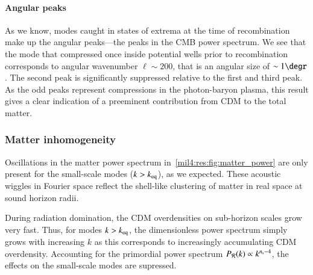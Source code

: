 





\paragraph{Angular peaks}
As we know, modes caught in states of extrema at the time of recombination make up the angular peaks---the peaks in the CMB power spectrum. We see that the mode that compressed once inside potential wells prior to recombination corresponds to angular wavenumber $\ell\sim 200$, that is an angular size of $\sim 1\degr$. The second peak is significantly suppressed relative to the first and third peak. As the odd peaks represent compressions in the photon-baryon plasma, this result gives a clear indication of a preeminent contribution from CDM to the total matter.  




\subsubsection{Matter inhomogeneity}
Oscillations in the matter power spectrum in~\cref{mil4:res:fig:matter_power} are only present for the small-scale modes ($k>k_\mathrm{eq}$), as we expected. These acoustic wiggles in Fourier space reflect the shell-like clustering of matter in real space at sound horizon radii. 

During radiation domination, the CDM overdensities on sub-horizon scales grow very fast. Thus, for modes $k>k_\mathrm{eq}$, the dimensionless power spectrum simply grows with increasing $k$ as this corresponds to increasingly accumulating CDM overdensity. Accounting for the primordial power spectrum $P_\mathcal{R}(k)\propto k^{n_\mathrm{s} - 4}$, the effects on the small-scale modes are supressed. 



